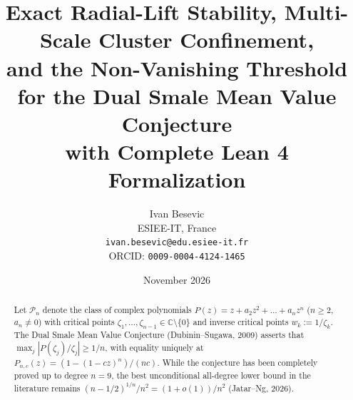 \documentclass[11pt,a4paper]{article}
\title{Exact Radial-Lift Stability, Multi-Scale Cluster Confinement,\\
and the Non-Vanishing Threshold for the Dual Smale Mean Value Conjecture\\
with Complete Lean 4 Formalization}
\author{Ivan Besevic\\
ESIEE-IT, France\\
\texttt{ivan.besevic@edu.esiee-it.fr}\\
ORCID: \texttt{0009-0004-4124-1465}}
\date{November 2026}
\theoremstyle{definition}
\theoremstyle{remark}
\newcommand{\CC}{\mathbb{C}}
\begin{document}
\maketitle

\begin{abstract}
Let $\mathcal{P}_n$ denote the class of complex polynomials $P(z) = z + a_2 z^2 + \dots + a_n z^n$ ($n \ge 2$, $a_n \neq 0$) with critical points $\zeta_1, \dots, \zeta_{n-1} \in \CC \setminus \{0\}$ and inverse critical points $w_k := 1/\zeta_k$. The Dual Smale Mean Value Conjecture (Dubinin--Sugawa, 2009) asserts that $\max_j |P(\zeta_j)/\zeta_j| \ge 1/n$, with equality uniquely at $P_{n,c}(z) = (1 - (1 - cz)^n)/(nc)$. While the conjecture has been completely proved up to degree $n = 9$, the best unconditional all-degree lower bound in the literature remains $(n - 1/2)^{1/n}/n^2 = (1 + o(1))/n^2$ (Jatar--Ng, 2026).


\end{abstract}
\end{document}
